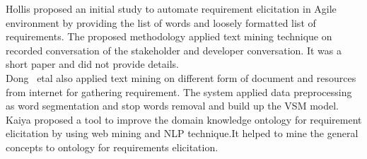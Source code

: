	Hollis \etal \cite{Hollis2017} proposed an initial study to automate requirement elicitation in Agile environment by providing the list of
words and loosely formatted list of requirements. The proposed methodology
applied text mining technique on recorded conversation of the stakeholder and
developer conversation. It was a short paper and did not provide details.\\

	Dong ~etal \cite{dong2010} also applied text mining on
different form of document and resources from internet for gathering
requirement. The system applied data preprocessing as word segmentation and stop
words removal and build up the VSM model. Kaiya \etal \cite {Kaiya:2010} proposed a
tool to improve the domain knowledge ontology for requirement elicitation by using web mining and NLP
technique.It helped to mine the general
concepts to ontology for requirements elicitation.\\


